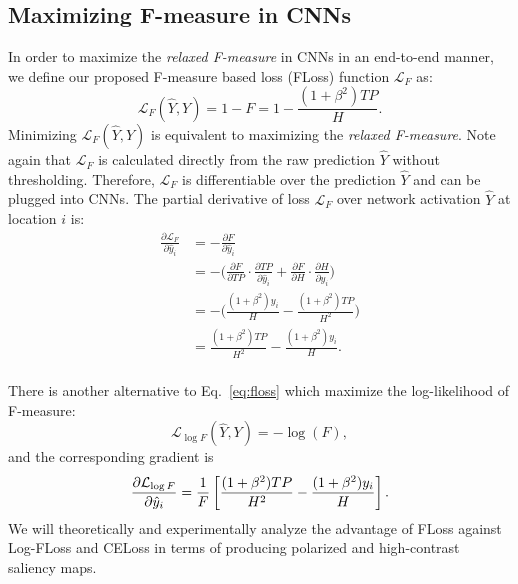 \documentclass[10pt,twocolumn,letterpaper]{article}
\begin{document}
\subsection{Maximizing F-measure in CNNs}
In order to maximize the \emph{relaxed F-measure} in CNNs in an end-to-end manner,
we define our proposed F-measure based loss (FLoss) function $\mathcal{L}_{F}$ as:
\begin{equation}
\mathcal{L}_{F}(\hat{Y}, Y) = 1 - F = 1 - \frac{(1 + \beta^2)TP}{H}\label{eq:floss}.
\end{equation}
Minimizing $\mathcal{L}_{F}(\hat{Y}, Y)$ is equivalent to maximizing the \emph{relaxed F-measure}.
%
Note again that $\mathcal{L}_{F}$ is calculated directly from the raw prediction $\hat{Y}$ without
thresholding.
%
Therefore, $\mathcal{L}_{F}$ is differentiable
over the prediction $\hat{Y}$ and can be plugged into CNNs.
%
The partial derivative of loss $\mathcal{L}_{F}$ over network activation $\hat{Y}$ at location $i$ is:
\begin{equation}
\begin{split}
\frac{\partial \mathcal{L}_{F}}{\partial \hat{y}_i}
  &= -\frac{\partial F}{\partial \hat{y}_i} \\
  &= -\Big(\frac{\partial F}{\partial TP}\cdot \frac{\partial TP}{\partial \hat{y}_i} +
        \frac{\partial F}{\partial H }\cdot \frac{\partial H }{\partial \hat{y}_i}\Big) \\
  &= -\Big(\frac{(1+\beta^2)y_i}{H} - \frac{(1+\beta^2)TP}{H^2}\Big) \\
  &= \frac{(1+\beta^2)TP}{H^2} - \frac{(1+\beta^2)y_i}{H} .\\
\end{split}\label{eq:grad-floss}
\end{equation}

There is another alternative to Eq.~\ref{eq:floss} which maximize the log-likelihood of F-measure:
\begin{equation}
  \mathcal{L}_{\log F}(\hat{Y}, Y) = -\log(F)\label{eq:logfloss},
\end{equation}
and the corresponding gradient is
\begin{equation}
\frac{\partial \mathcal{L}_{\log F}}{\partial \hat{y}_i} =
\frac{1}{F}\left[\frac{(1+\beta^2)TP}{H^2} - \frac{(1+\beta^2)y_i}{H}\right]. \\
\label{eq:grad-logfloss}
\end{equation}
We will theoretically and experimentally analyze the advantage of
FLoss against Log-FLoss and CELoss in terms of
producing polarized and high-contrast saliency maps.
\end{document}
